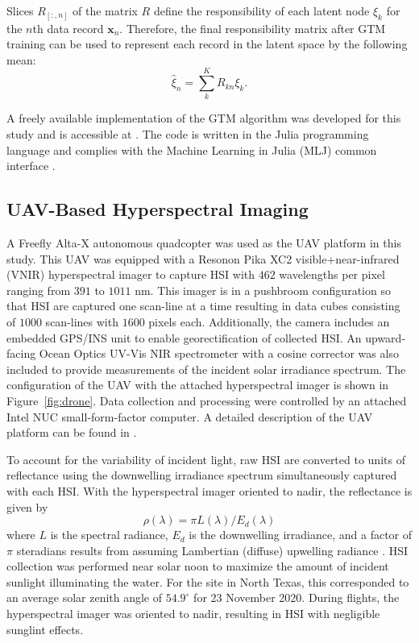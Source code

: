 Slices $R_{[:,n]}$ of the matrix $R$ define the responsibility of each latent node $\xi_k$ for the $n$th data record $\mathbf{x}_n$. Therefore, the final responsibility matrix after GTM training can be used to represent each record in the latent space by the following mean:
\begin{equation}\label{eq:mean-resp}
    \hat{\xi}_n = \sum_{k}^K R_{kn}\xi_k.
\end{equation}

A freely available implementation of the GTM algorithm was developed for this study and is accessible at \cite{gtm-code}. The code is written in the Julia programming language and complies with the Machine Learning in Julia (MLJ) common interface \cite{bezanson2012julia,blaom2020mlj}.

\subsection{UAV-Based Hyperspectral Imaging}

A Freefly Alta-X autonomous quadcopter was used as the UAV platform in this study. This UAV was equipped with a Resonon Pika XC2 visible+near-infrared (VNIR) hyperspectral imager to capture HSI with $462$ wavelengths per pixel ranging from $391$ to $1011$ nm. This imager is in a pushbroom configuration so that HSI are captured one scan-line at a time resulting in data cubes consisting of $1000$ scan-lines with $1600$ pixels each. Additionally, the camera includes an embedded GPS/INS unit to enable georectification of collected HSI. An upward-facing Ocean Optics UV-Vis NIR spectrometer with a cosine corrector was also included to provide measurements of the incident solar irradiance spectrum. The configuration of the UAV with the attached hyperspectral imager is shown in Figure~\ref{fig:drone}. Data collection and processing were controlled by an attached Intel NUC small-form-factor computer. A detailed description of the UAV platform can be found in \cite{robot-team-1}.

To account for the variability of incident light, raw HSI are converted to units of reflectance using the downwelling irradiance spectrum simultaneously captured with each HSI. With the hyperspectral imager oriented to nadir, the reflectance is given by
\begin{equation}\label{eq:reflectance}
    \rho(\lambda) = \pi L(\lambda)/E_d(\lambda)
\end{equation}
where $L$ is the spectral radiance, $E_d$ is the downwelling irradiance, and a factor of $\pi$ steradians results from assuming Lambertian (diffuse) upwelling radiance \cite{ruddick2019review}. HSI collection was performed near solar noon to maximize the amount of incident sunlight illuminating the water. For the site in North Texas, this corresponded to an average solar zenith angle of $54.9^\circ$ for 23 November 2020. During flights, the hyperspectral imager was oriented to nadir, resulting in HSI with negligible sunglint effects.


